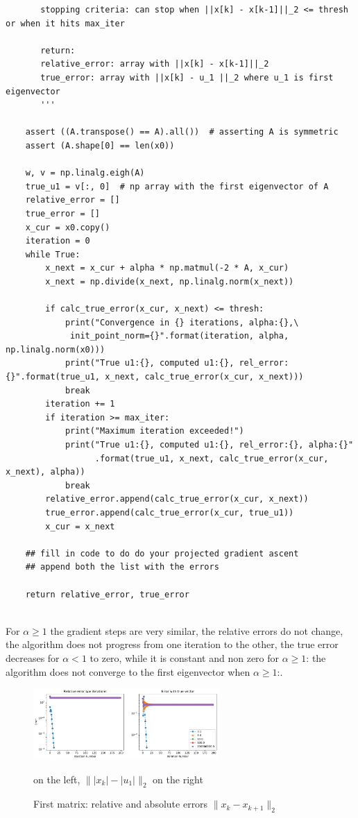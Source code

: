 \documentclass[12pt,twoside]{article}
\begin{document}
\begin{enumerate}
\begin{enumerate}
\begin{verbatim}
       stopping criteria: can stop when ||x[k] - x[k-1]||_2 <= thresh or when it hits max_iter
       
       return: 
       relative_error: array with ||x[k] - x[k-1]||_2  
       true_error: array with ||x[k] - u_1 ||_2 where u_1 is first eigenvector
       '''

    assert ((A.transpose() == A).all())  # asserting A is symmetric
    assert (A.shape[0] == len(x0))

    w, v = np.linalg.eigh(A)
    true_u1 = v[:, 0]  # np array with the first eigenvector of A
    relative_error = []
    true_error = []
    x_cur = x0.copy()
    iteration = 0
    while True:
        x_next = x_cur + alpha * np.matmul(-2 * A, x_cur)
        x_next = np.divide(x_next, np.linalg.norm(x_next))

        if calc_true_error(x_cur, x_next) <= thresh:
            print("Convergence in {} iterations, alpha:{},\
             init_point_norm={}".format(iteration, alpha, np.linalg.norm(x0)))
            print("True u1:{}, computed u1:{}, rel_error:{}".format(true_u1, x_next, calc_true_error(x_cur, x_next)))
            break
        iteration += 1
        if iteration >= max_iter:
            print("Maximum iteration exceeded!")
            print("True u1:{}, computed u1:{}, rel_error:{}, alpha:{}"
                  .format(true_u1, x_next, calc_true_error(x_cur, x_next), alpha))
            break
        relative_error.append(calc_true_error(x_cur, x_next))
        true_error.append(calc_true_error(x_cur, true_u1))
        x_cur = x_next

    ## fill in code to do do your projected gradient ascent
    ## append both the list with the errors

    return relative_error, true_error
        
\end{verbatim}

For  $\alpha \ge 1$ the gradient steps are very similar, the relative errors do not change, the algorithm does not progress from one iteration to the other, the true error decreases
for $\alpha < 1$ to zero, while it is constant and non zero for $\alpha \ge 1$: the algorithm does not converge to the first eigenvector when $\alpha \ge 1$:.

\begin{figure}[H]
	\centering
	\includegraphics[width=200pt]{figures/random_init_2.pdf}
	\caption{First matrix: relative and absolute errors  $\| x_k - x_{k+1}\|_2$} on the left,  $\| |x_k| - |u_1| \|_2$ on the right
	\label{fig1}
\end{figure}


\end{enumerate}
\end{enumerate}
\end{document}
